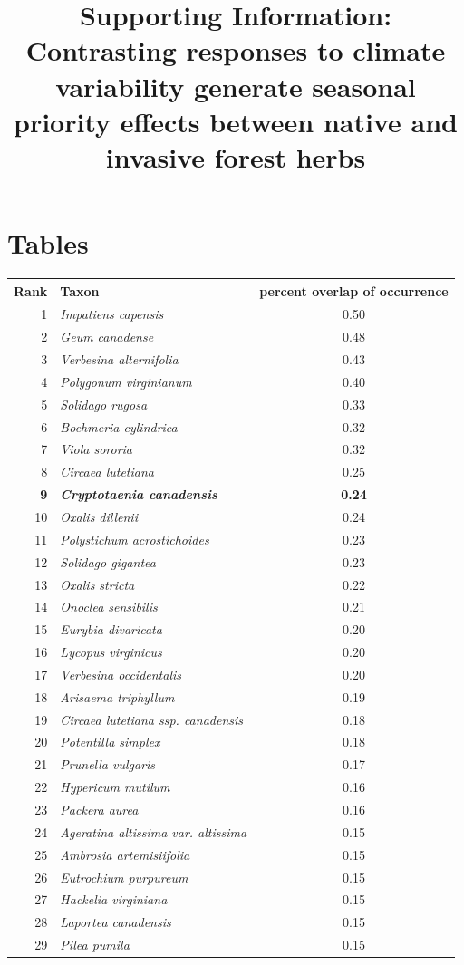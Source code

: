 \documentclass{article}[11pt]
\title{Supporting Information: Contrasting responses to climate variability generate seasonal priority effects between native and invasive forest herbs}
\date{}
\begin{document}

\maketitle
\pagebreak
\section*{Tables}
\begin{table}[hp]
\centering
\begin{tabular}{|r|l|c|}
  \hline
 Rank & Taxon & percent overlap of occurrence \\ 
  \hline
1 & \emph{Impatiens capensis} & 0.50 \\ 
  2 & \emph{Geum canadense} & 0.48 \\ 
  3 & \emph{Verbesina alternifolia} & 0.43 \\ 
  4 & \emph{Polygonum virginianum} & 0.40 \\ 
  5 & \emph{Solidago rugosa} & 0.33 \\ 
  6 & \emph{Boehmeria cylindrica} & 0.32 \\ 
  7 & \emph{Viola sororia} & 0.32 \\ 
  8 & \emph{Circaea lutetiana} & 0.25 \\ 
  \hline
  \textbf{9} & \textbf{\emph{Cryptotaenia canadensis}} & \textbf{0.24} \\ 
  \hline
  10 & \emph{Oxalis dillenii} & 0.24 \\ 
  11 & \emph{Polystichum acrostichoides} & 0.23 \\ 
  12 & \emph{Solidago gigantea} & 0.23 \\ 
  13 & \emph{Oxalis stricta} & 0.22 \\ 
  14 & \emph{Onoclea sensibilis} & 0.21 \\ 
  15 & \emph{Eurybia divaricata} & 0.20 \\ 
  16 & \emph{Lycopus virginicus} & 0.20 \\ 
  17 & \emph{Verbesina occidentalis} & 0.20 \\ 
  18 & \emph{Arisaema triphyllum} & 0.19 \\ 
  19 & \emph{Circaea lutetiana ssp. canadensis} & 0.18 \\ 
  20 & \emph{Potentilla simplex} & 0.18 \\ 
  21 & \emph{Prunella vulgaris} & 0.17 \\ 
  22 & \emph{Hypericum mutilum} & 0.16 \\ 
  23 & \emph{Packera aurea} & 0.16 \\ 
  24 & \emph{Ageratina altissima var. altissima} & 0.15 \\ 
  25 & \emph{Ambrosia artemisiifolia} & 0.15 \\ 
  26 & \emph{Eutrochium purpureum} & 0.15 \\ 
  27 & \emph{Hackelia virginiana} & 0.15 \\ 
  28 & \emph{Laportea canadensis} & 0.15 \\ 
  29 & \emph{Pilea pumila} & 0.15 \\ 


\end{tabular}
\end{table}
\end{document}
